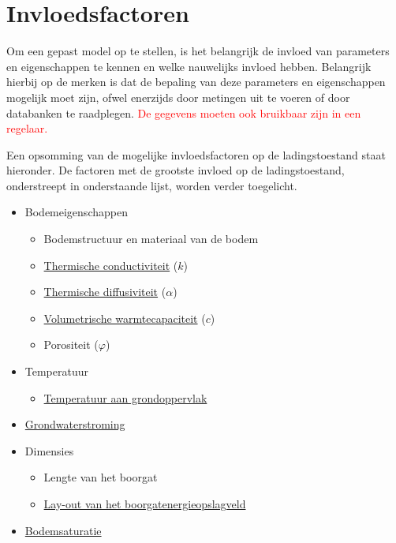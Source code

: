 \documentclass[a4paper,oneside,11pt]{report}
\numberwithin{figure}{section}
\numberwithin{table}{section}
\numberwithin{equation}{section}
\begin{document}
\newpage
\section{Invloedsfactoren}
Om een gepast model op te stellen, is het belangrijk de invloed van parameters en eigenschappen te kennen en welke nauwelijks invloed hebben. Belangrijk hierbij op de merken is dat de bepaling van deze parameters en eigenschappen mogelijk moet zijn, ofwel enerzijds door metingen uit te voeren of door databanken te raadplegen. 
\textcolor{red}{De gegevens moeten ook bruikbaar zijn in een regelaar.}
\par Een opsomming van de mogelijke invloedsfactoren op de ladingstoestand staat hieronder. De factoren met de grootste invloed op de ladingstoestand, onderstreept in onderstaande lijst, worden verder toegelicht. 
\begin{itemize}
\item Bodemeigenschappen
	\begin{itemize}
	\item Bodemstructuur en materiaal van de bodem
   	\item \underline{Thermische conductiviteit} ($k$)
	\item \underline{Thermische diffusiviteit} ($\alpha$)
	\item \underline{Volumetrische warmtecapaciteit} ($c$)
	\item Porositeit ($\varphi$)
	\end{itemize}	
\item Temperatuur
	\begin{itemize}
	\item \underline{Temperatuur aan grondoppervlak}
	\end{itemize}
\item \underline{Grondwaterstroming}
\item Dimensies
	\begin{itemize}
	\item Lengte van het boorgat
	\item \underline{Lay-out van het boorgatenergieopslagveld}
	\end{itemize}
\item \underline{Bodemsaturatie}
\end{itemize}
	
\end{document}
